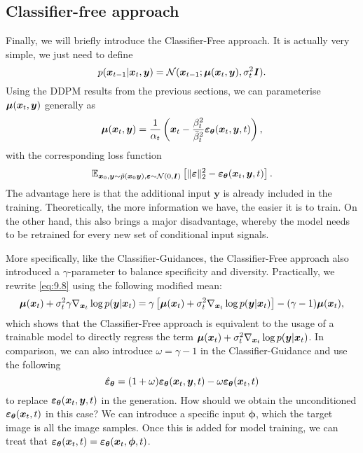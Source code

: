 \subsection{Classifier-free approach}
Finally, we will briefly introduce the Classifier-Free approach. It is actually very simple, we just need to define
\begin{equation}
    \label{eq:9.20}
    p(\bm{x}_{t-1}|\bm{x}_{t},\bm{y})=\mathcal{N}(\bm{x}_{t-1};\bm{\mu}(\bm{x}_{t},\bm{y}),\sigma_t^2\bm{I}).
\end{equation}
Using the DDPM results from the previous sections, we can parameterise $\bm{\mu}(\bm{x}_{t},\bm{y})$ generally as 
\begin{equation}
    \label{eq:9.21}
    \bm{\mu}(\bm{x}_{t},\bm{y})=\frac{1}{\alpha_t}\left(\bm{x}_{t} - \frac{\beta_t^2}{\bar{\beta}_t^2}\bm{\varepsilon}_{\bm{\theta}}(\bm{x}_{t},\bm{y},t) \right),
\end{equation}
with the corresponding loss function 
\begin{equation}
    \label{eq:9.22}
\mathbb{E}_{\bm{x}_0,\bm{y}\sim\tilde{p}(\bm{x}_0\bm{y}),\bm{\varepsilon}\sim\mathcal{N}(0,\bm{I})}\left[\|\bm{\varepsilon} \|_2^2 -\bm{\varepsilon}_{\bm{\theta}}(\bm{x}_{t},\bm{y},t) \right].
\end{equation}
The advantage here is that the additional input $\bm{y}$ is already included in the training. Theoretically, the more information we have, the easier it is to train. On the other hand, this also brings a major disadvantage, whereby the model needs to be retrained for every new set of conditional input signals. 

More specifically, like the Classifier-Guidances, the Classifier-Free approach also introduced a $\gamma$-parameter to balance specificity and diversity. Practically, we rewrite \cref{eq:9.8} using the following modified mean:
\begin{equation}
    \label{eq:9.23}
    \bm{\mu}(\bm{x}_{t})+\sigma_t^2\gamma\nabla_{\bm{x}_{t}}\log p(\bm{y}|\bm{x}_{t})=\gamma\left[\bm{\mu}(\bm{x}_{t})+\sigma_t^2\nabla_{\bm{x}_{t}}\log p(\bm{y}|\bm{x}_{t}) \right] -(\gamma-1)\bm{\mu}(\bm{x}_{t}),
\end{equation}
which shows that the Classifier-Free approach is equivalent to the usage of a trainable model to directly regress the term $\bm{\mu}(\bm{x}_{t})+\sigma_t^2\nabla_{\bm{x}_{t}}\log p(\bm{y}|\bm{x}_{t})$. In comparison, we can also introduce $\omega=\gamma-1$ in the Classifier-Guidance and use the following
\begin{equation}
    \hat{\bm{\varepsilon}}_{\bm{\theta}}=(1+\omega)\bm{\varepsilon}_{\bm{\theta}}(\bm{x}_{t},\bm{y},t)-\omega \bm{\varepsilon}_{\bm{\theta}}(\bm{x}_{t},t)
\end{equation}
to replace $\bm{\varepsilon}_{\bm{\theta}}(\bm{x}_{t},\bm{y},t)$ in the generation. How should we obtain the unconditioned $\bm{\varepsilon}_{\bm{\theta}}(\bm{x}_{t},t)$ in this case? We can introduce a specific input $\bm{\phi}$, which the target image is all the image samples. Once this is added for model training, we can treat that $\bm{\varepsilon}_{\bm{\theta}}(\bm{x}_{t},t)=\bm{\varepsilon}_{\bm{\theta}}(\bm{x}_{t},\bm{\phi},t)$.